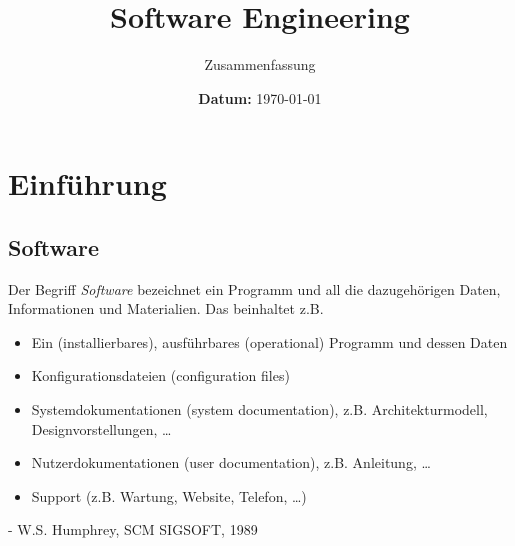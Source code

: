\documentclass[ngerman,color=3b]{tuda_summary}
\date{\textbf{\sffamily Datum:} \today}
\begin{document}
\title[SE]{Software Engineering}

\subtitle{Zusammenfassung}
\maketitle{}
\tableofcontents

\clearpage
\section{Einführung}
\subsection{Software}
\begin{definition}[Software]
    Der Begriff \textit{Software} bezeichnet ein Programm und all die dazugehörigen Daten, Informationen und Materialien. Das beinhaltet z.B.\begin{itemize}
        \item Ein (installierbares), ausführbares (operational) Programm und dessen Daten
        \item Konfigurationsdateien (configuration files)
        \item Systemdokumentationen (system documentation), z.B. Architekturmodell, Designvorstellungen, \dots
        \item Nutzerdokumentationen (user documentation), z.B. Anleitung, \dots
        \item Support (z.B. Wartung, Website, Telefon, \dots)
    \end{itemize}
    \hfill - W.S. Humphrey, SCM SIGSOFT, 1989
\end{definition}
\end{document}
